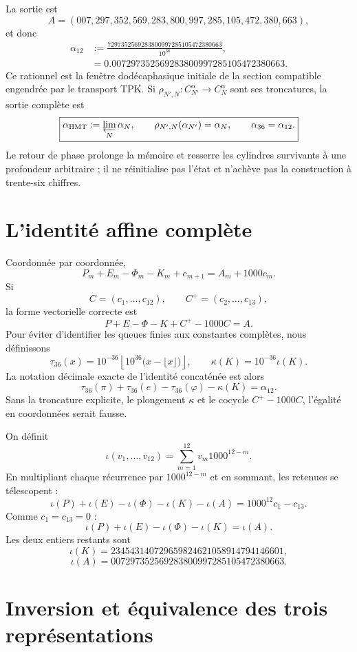 La sortie est
\[
\boxed{
A=(007,297,352,569,283,800,997,285,105,472,380,663),}
\]
et donc
\[
\boxed{
\begin{aligned}
\alpha_{12}
&:=\frac{7297352569283800997285105472380663}{10^{36}},\\
&=0.007297352569283800997285105472380663.
\end{aligned}}
\]
Ce rationnel est la fenêtre dodécaphasique initiale de la section compatible
engendrée par le transport TPK. Si
\(\rho_{N',N}:C_{N'}^\alpha\to C_N^\alpha\) sont ses troncatures, la
sortie complète est
\[
 \boxed{
 \alpha_{\mathrm{HMT}}
 :=\varprojlim_N\alpha_N,\qquad
 \rho_{N',N}(\alpha_{N'})=\alpha_N,\qquad
 \alpha_{36}=\alpha_{12}.}
\]
Le retour de phase prolonge la mémoire et resserre les cylindres
survivants à une profondeur arbitraire ; il ne réinitialise pas l'état et n'achève pas la
construction à trente-six chiffres.

\section{L'identité affine complète}

Coordonnée par coordonnée,
\[
\boxed{
P_m+E_m-\Phi_m-K_m+c_{m+1}
=A_m+1000c_m.}
\]
Si
\[
C=(c_1,\ldots,c_{12}),
\qquad
C^+=(c_2,\ldots,c_{13}),
\]
la forme vectorielle correcte est
\[
\boxed{P+E-\Phi-K+C^+-1000C=A.}
\]
Pour éviter d'identifier les queues finies aux constantes complètes,
nous définissons
\[
 \tau_{36}(x)=10^{-36}\left\lfloor10^{36}
 \bigl(x-\lfloor x\rfloor\bigr)\right\rfloor,
 \qquad
 \kappa(K)=10^{-36}\iota(K).
\]
La notation décimale exacte de l'identité concaténée est alors
\[
 \tau_{36}(\pi)+\tau_{36}(e)-\tau_{36}(\varphi)-\kappa(K)
 =\alpha_{12}.
\]
Sans la troncature explicite, le plongement \(\kappa\) et le cocycle
\(C^+-1000C\), l'égalité en coordonnées serait fausse.

On définit
\[
\iota(v_1,\ldots,v_{12})
=\sum_{m=1}^{12}v_m1000^{12-m}.
\]
En multipliant chaque récurrence par \(1000^{12-m}\) et en sommant, les retenues
se télescopent :
\[
\iota(P)+\iota(E)-\iota(\Phi)-\iota(K)-\iota(A)
=1000^{12}c_1-c_{13}.
\]
Comme \(c_1=c_{13}=0\) :
\[
\boxed{
\iota(P)+\iota(E)-\iota(\Phi)-\iota(K)=\iota(A).}
\]
Les deux entiers restants sont
\[
\iota(K)=234543140729659824621058914794146601,
\]
\[
\iota(A)=007297352569283800997285105472380663.
\]

\section{Inversion et équivalence des trois représentations}

